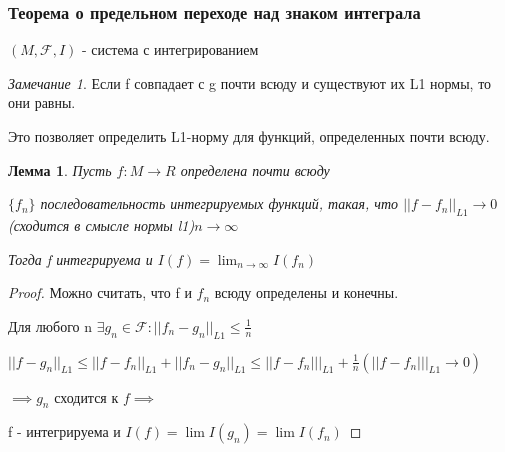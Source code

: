\documentclass[a4paper]{article}
\newtheorem{lemma}{Лемма}[section]
\theoremstyle{definition}
\theoremstyle{remark}
\newtheorem*{remark}{Замечание}
\begin{document}
\subsubsection*{Теорема о предельном переходе над знаком интеграла}
$(M, \mathcal{F} , I) $ - система с интегрированием
\begin{remark}
     Если f совпадает с g почти всюду и существуют их L1 нормы, то они равны. 

     Это позволяет определить L1-норму для функций, определенных почти всюду.
\end{remark}
\begin{lemma}
     Пусть $f: M\to R$ определена почти всюду
     
     $\{f_n\}$ последовательность интегрируемых функций, такая, что $||f - f_n||_{L1}\to 0 $(сходится в смысле нормы l1)$ n\to \infty$

     Тогда f интегрируема и $I(f) = \lim_{n\to\infty} I(f_n)$
\end{lemma}

\begin{proof}
     Можно считать, что f и $f_n$ всюду определены и конечны.

     Для любого n $\exists g_n\in\mathcal{F} : ||f_n-g_n||_{L1}\leq \frac{1}{n}$

     $||f - g_n||_{L1}\leq ||f-f_n||_{L1} + ||f_n- g_n||_{L1}\leq ||f-f_n|||_{L1}+\frac{1}{n} (||f-f_n|||_{L1}\to 0)$

     $\implies g_n$ сходится к $f \implies$

     f - интегрируема и $I(f) = \lim I(g_n) = \lim I(f_n)$
\end{proof}
\end{document}
